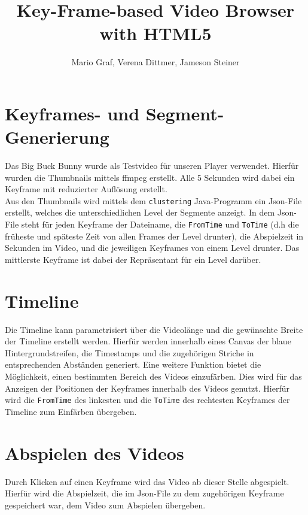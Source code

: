 \documentclass[a4paper,11pt,german]{scrartcl}
\title{Key-Frame-based Video Browser with HTML5}
\author{Mario Graf, Verena Dittmer, Jameson Steiner}
\begin{document}
\maketitle

\section*{Keyframes- und Segment-Generierung}
Das Big Buck Bunny wurde als Testvideo für unseren Player verwendet. Hierfür wurden die Thumbnails mittels ffmpeg erstellt. Alle 5 Sekunden wird dabei ein Keyframe mit reduzierter Auflösung erstellt. \\
Aus den Thumbnails wird mittels dem \texttt{clustering} Java-Programm ein Json-File erstellt, welches die unterschiedlichen Level der Segmente anzeigt. In dem Json-File steht für jeden Keyframe der Dateiname, die \texttt{FromTime} und \texttt{ToTime} (d.h die früheste und späteste Zeit von allen Frames der Level drunter), die Abspielzeit in Sekunden im Video, und die jeweiligen Keyframes von einem Level drunter. Das mittlerste Keyframe ist dabei der Repräsentant für ein Level darüber.

\section*{Timeline}
Die Timeline kann parametrisiert über die Videolänge und die gewünschte Breite der Timeline erstellt werden. Hierfür werden innerhalb eines Canvas der blaue Hintergrundstreifen, die Timestamps und die zugehörigen Striche in entsprechenden Abständen generiert. Eine weitere Funktion bietet die Möglichkeit, einen bestimmten Bereich des Videos einzufärben. Dies wird für das Anzeigen der Positionen der Keyframes innerhalb des Videos genutzt. Hierfür wird die \texttt{FromTime} des linkesten und die \texttt{ToTime} des rechtesten Keyframes der Timeline zum Einfärben übergeben. 

\section*{Abspielen des Videos}
Durch Klicken auf einen Keyframe wird das Video ab dieser Stelle abgespielt. Hierfür wird die Abspielzeit, die im Json-File zu dem zugehörigen Keyframe gespeichert war, dem Video zum Abspielen übergeben.

\end{document}
